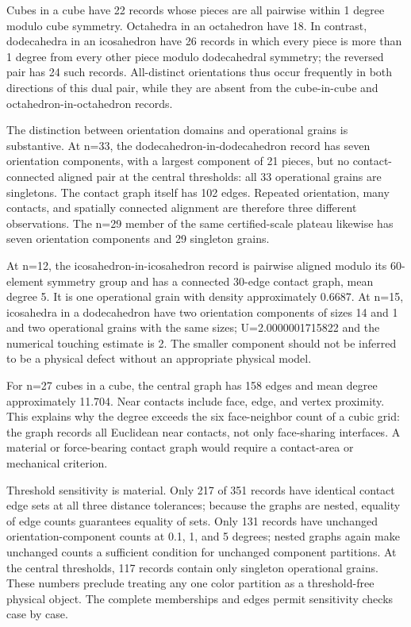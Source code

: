 \documentclass[11pt,a4paper]{article}
\begin{document}
Cubes in a cube have 22 records whose pieces are all pairwise within 1 degree modulo cube symmetry. Octahedra in an octahedron have 18. In contrast, dodecahedra in an icosahedron have 26 records in which every piece is more than 1 degree from every other piece modulo dodecahedral symmetry; the reversed pair has 24 such records. All-distinct orientations thus occur frequently in both directions of this dual pair, while they are absent from the cube-in-cube and octahedron-in-octahedron records.

The distinction between orientation domains and operational grains is substantive. At n=33, the dodecahedron-in-dodecahedron record has seven orientation components, with a largest component of 21 pieces, but no contact-connected aligned pair at the central thresholds: all 33 operational grains are singletons. The contact graph itself has 102 edges. Repeated orientation, many contacts, and spatially connected alignment are therefore three different observations. The n=29 member of the same certified-scale plateau likewise has seven orientation components and 29 singleton grains.

At n=12, the icosahedron-in-icosahedron record is pairwise aligned modulo its 60-element symmetry group and has a connected 30-edge contact graph, mean degree 5. It is one operational grain with density approximately 0.6687. At n=15, icosahedra in a dodecahedron have two orientation components of sizes 14 and 1 and two operational grains with the same sizes; U=2.0000001715822 and the numerical touching estimate is 2. The smaller component should not be inferred to be a physical defect without an appropriate physical model.

For n=27 cubes in a cube, the central graph has 158 edges and mean degree approximately 11.704. Near contacts include face, edge, and vertex proximity. This explains why the degree exceeds the six face-neighbor count of a cubic grid: the graph records all Euclidean near contacts, not only face-sharing interfaces. A material or force-bearing contact graph would require a contact-area or mechanical criterion.

Threshold sensitivity is material. Only 217 of 351 records have identical contact edge sets at all three distance tolerances; because the graphs are nested, equality of edge counts guarantees equality of sets. Only 131 records have unchanged orientation-component counts at 0.1, 1, and 5 degrees; nested graphs again make unchanged counts a sufficient condition for unchanged component partitions. At the central thresholds, 117 records contain only singleton operational grains. These numbers preclude treating any one color partition as a threshold-free physical object. The complete memberships and edges permit sensitivity checks case by case.
\end{document}
